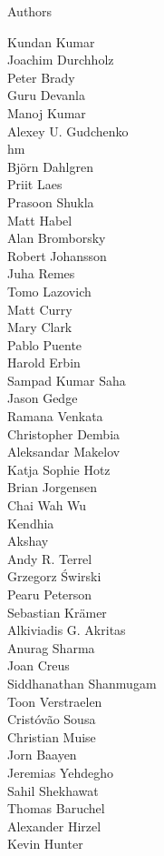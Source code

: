 \begin{frame}{Authors}
\begin{multicols}{5}
Kundan Kumar\\
Joachim Durchholz\\
Peter Brady\\
Guru Devanla\\
Manoj Kumar\\
Alexey U. Gudchenko\\
hm\\
Björn Dahlgren\\
Priit Laes\\
Prasoon Shukla\\
Matt Habel\\
Alan Bromborsky\\
Robert Johansson\\
Juha Remes\\
Tomo Lazovich\\
Matt Curry\\
Mary Clark\\
Pablo Puente\\
Harold Erbin\\
Sampad Kumar Saha\\
Jason Gedge\\
Ramana Venkata\\
Christopher Dembia\\
Aleksandar Makelov\\
Katja Sophie Hotz\\
Brian Jorgensen\\
Chai Wah Wu\\
Kendhia\\
Akshay\\
Andy R. Terrel\\
Grzegorz Świrski\\
Pearu Peterson\\
Sebastian Krämer\\
Alkiviadis G. Akritas\\
Anurag Sharma\\
Joan Creus\\
Siddhanathan Shanmugam\\
Toon Verstraelen\\
Cristóvão Sousa\\
Christian Muise\\
Jorn Baayen\\
Jeremias Yehdegho\\
Sahil Shekhawat\\
Thomas Baruchel\\
Alexander Hirzel\\
Kevin Hunter\\

\end{multicols}
\end{frame}
